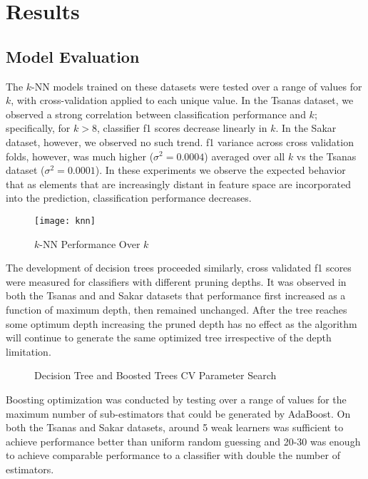 \documentclass[12pt]{article}
\begin{document}
\section{Results}
\subsection{Model Evaluation}
The $k$-NN models trained on these datasets were tested over a range of values for $k$, with cross-validation applied to each unique value. In the Tsanas dataset, we observed a strong correlation between classification performance and $k$; specifically, for $k > 8$, classifier f1 scores decrease linearly in $k$. In the Sakar dataset, however, we observed no such trend. f1 variance across cross validation folds, however, was much higher ($\sigma^2=0.0004$) averaged over all $k$ vs the Tsanas dataset ($\sigma^2=0.0001$). In these experiments we observe the expected behavior that as elements that are increasingly distant in feature space are incorporated into the prediction, classification performance decreases.
\begin{figure}
    \centering
    \texttt{[image: knn]}
    \caption{$k$-NN Performance Over $k$}
\end{figure}

The development of decision trees proceeded similarly, cross validated f1 scores were measured for classifiers with different pruning depths. It was observed in both the Tsanas and and Sakar datasets that performance first increased as a function of maximum depth, then remained unchanged. After the tree reaches some optimum depth increasing the pruned depth has no effect as the algorithm will continue to generate the same optimized tree irrespective of the depth limitation.
\begin{figure}%
    \centering
    \qquad
    \caption{Decision Tree and Boosted Trees CV Parameter Search}
\end{figure}

Boosting optimization was conducted by testing over a range of values for the maximum number of sub-estimators that could be generated by AdaBoost. On both the Tsanas and Sakar datasets, around 5 weak learners was sufficient to achieve performance better than uniform random guessing and 20-30 was enough to achieve comparable performance to a classifier with double the number of estimators.
\end{document}
